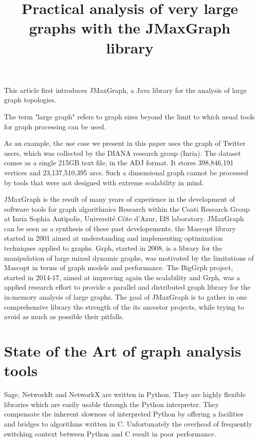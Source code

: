 \documentclass[11pt,a4paper]{article}
\title{Practical analysis of very large graphs with the JMaxGraph library}
\author{}
\begin{document}
\maketitle


This article first introduces JMaxGraph, a Java library for the analysis of large graph topologies.

The term "large graph" refers to graph sizes beyond the limit to which usual tools for graph processing can be used.

As an example, the use case we present in this paper uses the graph of Twitter users, which was collected by the DIANA research group (Inria). The dataset comes as a single 215GB text file, in the ADJ format. It stores 
398,846,191 vertices and 23,137,510,395 arcs.
Such a dimensional graph cannot be processed by tools that were not designed with extreme scalability in mind.

JMaxGraph is the result of many years of experience in the development of software tools for graph algorithmics Research within the Coati Research Group at Inria Sophia Antipolis, Universit\'e C\^ote d'Azur, I3S laboratory. JMaxGraph can be seen as a synthesis of these past developements. the Mascopt library started in 2001 aimed at understanding and implementing optimization techniques applied to graphs.
Grph, started in 2008, is a library for the manipulation of large mixed dynamic graphs, was motivated by the limitations of Mascopt in terms of graph models and performance.
The BigGrph project, started in 2014-17,  aimed at improving again the scalability and Grph, was a applied research effort to provide a parallel and 
distributed graph library for the in-memory analysis of large graphs. 
The goal of JMaxGraph is to gather in one comprehensive library the strength of the its ancestor projects, while trying to avoid as much as possible their pitfalls.


\section{State of the Art of graph analysis tools}

Sage, NetworkIt and NetworkX are written in Python. They are highly flexible libraries which are easily usable through the Python interpreter. They compensate the inherent slowness of interpreted Python by offering a facilities and bridges to algorithms written in C. Unfortunately the overhead of frequently switching context between Python and C result in poor performance.
\end{document}

